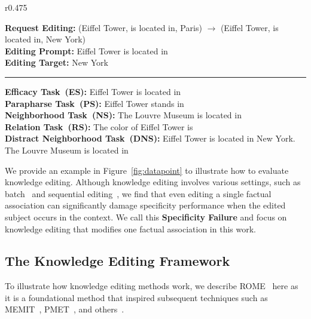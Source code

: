 \begin{wrapfigure}{r}{0.475\textwidth}
    \vspace{-5pt}
    \begin{AcademicBox}
    \small
    \textbf{Request Editing:} (Eiffel Tower, is located in, Paris) $\rightarrow$ (Eiffel Tower, is located in, New York) \\
    \textbf{Editing Prompt:} Eiffel Tower is located in \\
    \textbf{Editing Target:} New York \\
     \hrule \vspace{4pt}
    \textbf{Efficacy Task~(ES):} Eiffel Tower is located in  \\
    \textbf{Parapharse Task~(PS):} Eiffel Tower stands in  \\
    \textbf{Neighborhood Task~(NS):} The Louvre Museum is located in  \\
    \textbf{Relation Task~(RS):} The color of Eiffel Tower is  \\
    \textbf{Distract Neighborhood Task~(DNS):}  Eiffel Tower is located in New York. The Louvre Museum is located in  \\
     \vspace{-10pt}
    \end{AcademicBox}
    \caption{Example of evaluation tasks for Knowledge Editing.}
    \label{fig:datapoint}
\end{wrapfigure}

We provide an example in Figure~\ref{fig:datapoint} to illustrate how to evaluate knowledge editing.
Although knowledge editing involves various settings, such as batch~\citep{memit} and sequential editing~\citep{hartvigsen2024aging}, we find that even editing a single factual association can significantly damage specificity performance when the edited subject occurs in the context.
We call this \textbf{Specificity Failure} and focus on knowledge editing that modifies one factual association in this work.



\subsection{The Knowledge Editing Framework} 
\label{sec:edit_framework}
To illustrate how knowledge editing methods work, we describe ROME~\citep{rome} here as it is a foundational method that inspired subsequent techniques such as MEMIT~\citep{memit}, PMET~\citep{pmet}, and others~\citep{pmet, bird}.

